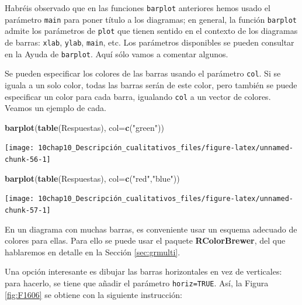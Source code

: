 \documentclass[
]{book}
\newenvironment{Shaded}{\begin{snugshade}}{\end{snugshade}}
\newcommand{\DataTypeTok}[1]{\textcolor[rgb]{0.13,0.29,0.53}{#1}}
\newcommand{\KeywordTok}[1]{\textcolor[rgb]{0.13,0.29,0.53}{\textbf{#1}}}
\newcommand{\NormalTok}[1]{#1}
\newcommand{\StringTok}[1]{\textcolor[rgb]{0.31,0.60,0.02}{#1}}
\theoremstyle{definition}
\theoremstyle{definition}
\theoremstyle{definition}
\theoremstyle{remark}
\begin{document}
Habréis observado que en las funciones \texttt{barplot} anteriores hemos usado el parámetro \texttt{main} para poner título a los diagramas; en general, la función \texttt{barplot} admite los parámetros de \texttt{plot} que tienen sentido en el contexto de los diagramas de barras: \texttt{xlab}, \texttt{ylab}, \texttt{main}, etc. Los parámetros disponibles se pueden consultar en la Ayuda de \texttt{barplot}. Aquí sólo vamos a comentar algunos.

Se pueden especificar los colores de las barras usando el parámetro \texttt{col}. Si se iguala a un solo color, todas las barras serán de este color, pero también se puede especificar un color para cada barra, igualando \texttt{col} a un vector de colores. Veamos un ejemplo de cada.

\begin{Shaded}
\begin{Highlighting}[]
\KeywordTok{barplot}\NormalTok{(}\KeywordTok{table}\NormalTok{(Respuestas), }\DataTypeTok{col=}\KeywordTok{c}\NormalTok{(}\StringTok{"green"}\NormalTok{))}
\end{Highlighting}
\end{Shaded}

\begin{center}\texttt{[image: 10chap10\_Descripción\_cualitativos\_files/figure-latex/unnamed-chunk-56-1]} \end{center}

\begin{Shaded}
\begin{Highlighting}[]
\KeywordTok{barplot}\NormalTok{(}\KeywordTok{table}\NormalTok{(Respuestas), }\DataTypeTok{col=}\KeywordTok{c}\NormalTok{(}\StringTok{"red"}\NormalTok{,}\StringTok{"blue"}\NormalTok{))}
\end{Highlighting}
\end{Shaded}

\begin{center}\texttt{[image: 10chap10\_Descripción\_cualitativos\_files/figure-latex/unnamed-chunk-57-1]} \end{center}

En un diagrama con muchas barras, es conveniente usar un esquema adecuado de colores para ellas. Para ello se puede usar el paquete \textbf{RColorBrewer}, del que hablaremos en detalle en la Sección \ref{sec:grmulti}.

Una opción interesante es dibujar las barras horizontales en vez de verticales: para hacerlo, se tiene que añadir el parámetro \texttt{horiz=TRUE}. Así, la Figura \ref{fig:F1606} se obtiene con la siguiente instrucción:
\end{document}
